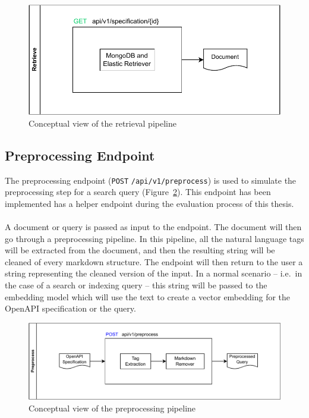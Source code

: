 \begin{figure}[!h]
    \begin{center}
        \includegraphics[width=0.5\linewidth]{assets/pdf/architecture/flow-retrieve}
    \end{center}

    \caption{Conceptual view of the retrieval pipeline}
    \label{fig:flow-retrieve}
\end{figure}

\subsection{Preprocessing Endpoint}\label{subsec:preprocessing-endpoint-1}
The preprocessing endpoint (\verb|POST| \verb|/api/v1/preprocess|) is used to simulate the preprocessing step for a search query (Figure~\ref{fig:flow-preprocess}).
This endpoint has been implemented has a helper endpoint during the evaluation process of this thesis. \\ \\
A document or query is passed as input to the endpoint.
The document will then go through a preprocessing pipeline.
In this pipeline, all the natural language tags will be extracted from the document, and then the resulting string will be cleaned of every markdown structure.
The endpoint will then return to the user a string representing the cleaned version of the input.
In a normal scenario -- i.e.\ in the case of a search or indexing query -- this string will be passed to the embedding model which will use the text to create a vector embedding for the OpenAPI specification or the query.

\begin{figure}[!h]
    \begin{center}
        \includegraphics[width=0.8\linewidth]{assets/pdf/architecture/flow-preprocess}
    \end{center}

    \caption{Conceptual view of the preprocessing pipeline}
    \label{fig:flow-preprocess}
\end{figure}

